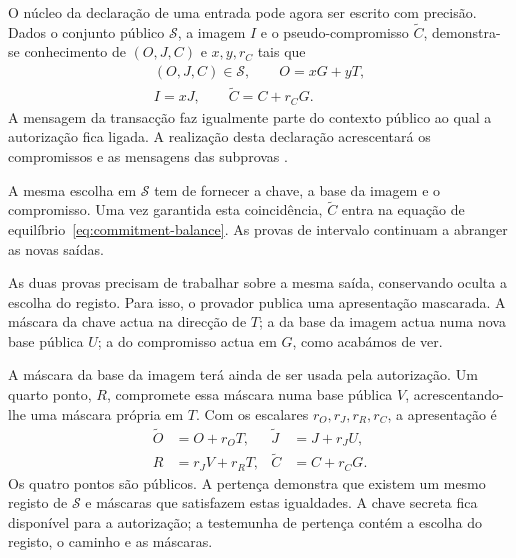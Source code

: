 O núcleo da declaração de uma entrada pode agora ser escrito com
precisão. Dados o conjunto público \(\mathcal S\), a imagem
\(I\) e o pseudo-compromisso \(\widetilde C\), demonstra-se
conhecimento de
\((O,J,C)\) e \(x,y,r_C\) tais que
\begin{equation}
 \begin{gathered}
  (O,J,C)\in\mathcal S,\qquad O=xG+yT,\\
  I=xJ,\qquad \widetilde C=C+r_CG.
 \end{gathered}
 \label{eq:fcmp-composed-statement}
\end{equation}
A mensagem da transacção faz igualmente parte do contexto público
ao qual a autorização fica ligada. A realização desta declaração
acrescentará os compromissos e as mensagens das subprovas
\cite{fcmp-composition-review}.

A mesma escolha em \(\mathcal S\) tem de fornecer a chave, a base
da imagem e o compromisso. Uma vez garantida esta coincidência,
\(\widetilde C\) entra na equação de equilíbrio~\eqref{eq:commitment-balance}.
As provas de intervalo continuam a abranger as novas saídas.


As duas provas precisam de trabalhar sobre a mesma saída, conservando
oculta a escolha do registo. Para isso, o provador publica uma
apresentação mascarada. A máscara da chave actua na direcção de
\(T\); a da base da imagem actua numa nova base pública \(U\);
a do compromisso actua em \(G\), como acabámos de ver.

A máscara da base da imagem terá ainda de ser usada pela autorização.
Um quarto ponto, \(R\), compromete essa máscara numa base pública
\(V\), acrescentando-lhe uma máscara própria em \(T\). Com os
escalares \(r_O,r_J,r_R,r_C\), a apresentação é
\begin{equation}
 \begin{aligned}
  \widetilde O&=O+r_OT,&
  \widetilde J&=J+r_JU,\\
  R&=r_JV+r_RT,&
  \widetilde C&=C+r_CG.
 \end{aligned}
 \label{eq:fcmp-public-presentation}
\end{equation}
Os quatro pontos são públicos. A pertença demonstra que existem um
mesmo registo de \(\mathcal S\) e máscaras que satisfazem estas
igualdades. A chave secreta fica disponível para a autorização;
a testemunha de pertença contém a escolha do registo, o caminho e
as máscaras.

